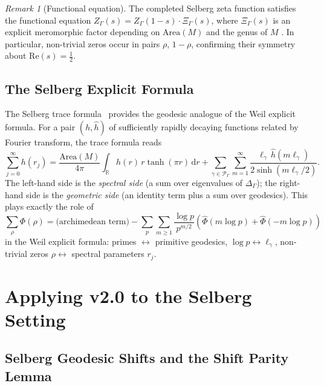 \documentclass[12pt,a4paper]{article}
\theoremstyle{definition}
\theoremstyle{remark}
\newtheorem{remark}[theorem]{Remark}
\newcommand{\RR}{\mathbb{R}}
\newcommand{\Sel}{Z_{\Gamma}}
\newcommand{\Delop}{\Delta_{\Gamma}}
\begin{document}
\begin{remark}[Functional equation]
\label{rem:func-eq}
The completed Selberg zeta function satisfies the functional equation
$\Sel(s) = \Sel(1-s) \cdot \Xi_\Gamma(s)$, where $\Xi_\Gamma(s)$ is an
explicit meromorphic factor depending on $\mathrm{Area}(M)$ and the genus of
$M$ \cite{Hejhal1976}.  In particular, non-trivial zeros occur in pairs
$\rho$, $1-\rho$, confirming their symmetry about $\mathrm{Re}(s)=\tfrac{1}{2}$.
\end{remark}

\subsection{The Selberg Explicit Formula}

The Selberg trace formula~\cite{Selberg1956, Hejhal1976} provides the
geodesic analogue of the Weil explicit formula. For a pair
$(h, \hat h)$ of sufficiently rapidly decaying functions related by Fourier
transform, the trace formula reads
\begin{equation}
\label{eq:Selberg-trace}
\sum_{j=0}^\infty h(r_j) = \frac{\mathrm{Area}(M)}{4\pi}\int_\RR h(r)\,r\tanh(\pi r)\,\mathrm{d}r
+ \sum_{\gamma \in \mathcal{P}_\Gamma}\sum_{m=1}^\infty \frac{\ell_\gamma\,\hat h(m\ell_\gamma)}{2\sinh(m\ell_\gamma/2)}.
\end{equation}
The left-hand side is the \emph{spectral side} (a sum over eigenvalues of
$\Delop$); the right-hand side is the \emph{geometric side} (an identity term
plus a sum over geodesics). This plays exactly the role of
\begin{equation*}
\sum_\rho \Phi(\rho) = \text{(archimedean term)} - \sum_p\sum_{m\ge 1}\frac{\log p}{p^{m/2}}(\hat\Phi(m\log p) + \hat\Phi(-m\log p))
\end{equation*}
in the Weil explicit formula: primes $\leftrightarrow$ primitive geodesics,
$\log p \leftrightarrow \ell_\gamma$, non-trivial zeros $\rho \leftrightarrow$
spectral parameters $r_j$.


\section{Applying v2.0 to the Selberg Setting}
\label{sec:v2-to-selberg}

\subsection{Selberg Geodesic Shifts and the Shift Parity Lemma}
\end{document}
